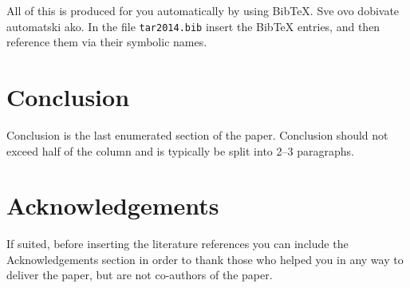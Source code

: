 \documentclass[10pt, a4paper]{article}
\begin{document}
All of this is produced for you automatically by using BibTeX. Sve ovo dobivate automatski ako. In the file \texttt{tar2014.bib} insert the BibTeX entries, and then reference them via their symbolic names.

\section{Conclusion}

Conclusion is the last enumerated section of the paper. Conclusion should not exceed half of the column and is typically be split into 2--3 paragraphs.

\section*{Acknowledgements}

If suited, before inserting the literature references you can include the Acknowledgements section in order to thank those who helped you in any way to deliver the paper, but are not co-authors of the paper.


 
\end{document}
